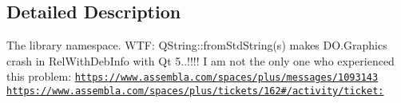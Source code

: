 \subsection{Detailed Description}
The library namespace. W\-T\-F\-: Q\-String\-::from\-Std\-String(s) makes D\-O.\-Graphics crash in Rel\-With\-Deb\-Info with Qt 5..!!!! I am not the only one who experienced this problem\-: \href{https://www.assembla.com/spaces/plus/messages/1093143}{\tt https\-://www.\-assembla.\-com/spaces/plus/messages/1093143} \href{https://www.assembla.com/spaces/plus/tickets/162#/activity/ticket:}{\tt https\-://www.\-assembla.\-com/spaces/plus/tickets/162\#/activity/ticket\-:} 